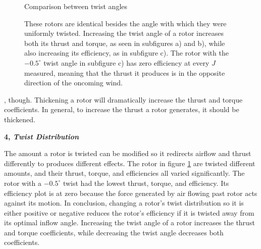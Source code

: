 \documentclass{article}
\begin{document}
\begin{figure}
  \centering
  \caption{Comparison between twist angles}
  \captionsetup{aboveskip=0pt,font=it}
  \caption*{These rotors are identical besides the angle with which they were uniformly twisted. Increasing the twist angle of a rotor increases both its thrust and torque, as seen in subfigures a) and b), while also increasing its efficiency, as in subfigure c). The rotor with the $-0.5^{\circ}$ twist angle in subfigure c) has zero efficiency at every $J$ measured, meaning that the thrust it produces is in the opposite direction of the oncoming wind.}
  \label{fig:6}
\end{figure}, though. Thickening a rotor will dramatically increase the thrust and torque coefficients. In general, to increase the thrust a rotor generates, it should be thickened. \newline

\textbf{4, \emph{Twist Distribution}} \newline

The amount a rotor is twisted can be modified so it redirects airflow and thrust differently to produces different effects. The rotor in figure \ref{fig:6} are twisted different amounts, and their thrust, torque, and efficiencies all varied significantly. The rotor with a $-0.5^{\circ}$ twist had the lowest thrust, torque, and efficiency. Its efficiency plot is at zero because the force generated by air flowing past rotor acts against its motion. In conclusion, changing a rotor's twist distribution so it is either positive or negative reduces the rotor's efficiency if it is twisted away from its optimal inflow angle. Increasing the twist angle of a rotor increases the thrust and torque coefficients, while decreasing the twist angle decreases both coefficients. \newline
\end{document}

